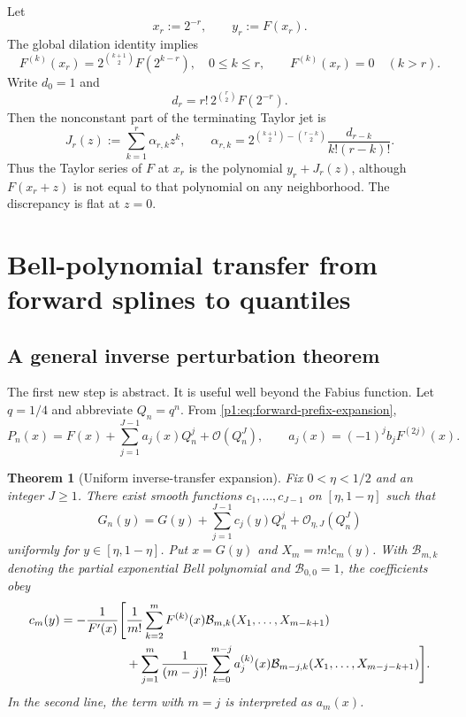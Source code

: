 \documentclass[11pt,oneside]{article}
\numberwithin{equation}{section}
\newtheorem{theorem}{Theorem}[section]
\theoremstyle{definition}
\theoremstyle{remark}
\newcommand{\bigO}{\mathcal O}
\newcommand{\InvF}{G}
\newcommand{\Fn}{P_n}
\newcommand{\Gn}{G_n}
\begin{document}
Let
\begin{equation}
 x_r:=2^{-r},\qquad y_r:=F(x_r).
 \label{p1:eq:xr-yr}
\end{equation}
The global dilation identity implies
\begin{equation}
 F^{(k)}(x_r)=2^{\binom{k+1}{2}}F(2^{k-r}),
 \quad 0\le k\le r,
 \qquad
 F^{(k)}(x_r)=0\quad(k>r).
 \label{p1:eq:dyadic-jet}
\end{equation}
Write $d_0=1$ and
\begin{equation}
 d_r=r!\,2^{\binom r2}F(2^{-r}).
 \label{p1:eq:d-def}
\end{equation}
Then the nonconstant part of the terminating Taylor jet is
\begin{equation}
 J_r(z):=\sum_{k=1}^{r}\alpha_{r,k}z^k,
 \qquad
 \alpha_{r,k}
 =2^{\binom{k+1}{2}-\binom{r-k}{2}}
 \frac{d_{r-k}}{k!(r-k)!}.
 \label{p1:eq:Jr}
\end{equation}
Thus the Taylor series of $F$ at $x_r$ is the polynomial $y_r+J_r(z)$, although
$F(x_r+z)$ is not equal to that polynomial on any neighborhood.  The discrepancy is flat
at $z=0$.

\section{Bell-polynomial transfer from forward splines to quantiles}
\label{p1:sec:inverse-transfer}

\subsection{A general inverse perturbation theorem}

The first new step is abstract.  It is useful well beyond the Fabius function.
Let $q=1/4$ and abbreviate $Q_n=q^n$.  From \eqref{p1:eq:forward-prefix-expansion},
\begin{equation}
 \Fn(x)=F(x)+\sum_{j=1}^{J-1}a_j(x)Q_n^j+\bigO(Q_n^J),
 \qquad
 a_j(x)=(-1)^jb_jF^{(2j)}(x).
 \label{p1:eq:an-def}
\end{equation}

\begin{theorem}[Uniform inverse-transfer expansion]
\label{p1:thm:inverse-transfer}
Fix $0<\eta<1/2$ and an integer $J\ge1$.  There exist smooth functions
$c_1,\ldots,c_{J-1}$ on $[\eta,1-\eta]$ such that
\begin{equation}
 \boxed{
 \Gn(y)=\InvF(y)+\sum_{j=1}^{J-1}c_j(y)Q_n^j
 +\bigO_{\eta,J}(Q_n^J)}
 \label{p1:eq:Gn-expansion}
\end{equation}
uniformly for $y\in[\eta,1-\eta]$.  Put $x=\InvF(y)$ and
$X_m=m!c_m(y)$.  With $\mathcal B_{m,k}$ denoting the partial exponential Bell
polynomial and $\mathcal B_{0,0}=1$, the coefficients obey
\begin{align}
 c_m(y)=-\frac1{F'(x)}\Bigg[&
 \frac1{m!}\sum_{k=2}^{m}F^{(k)}(x)
 \mathcal B_{m,k}(X_1,\ldots,X_{m-k+1})
 \notag\\
 &+\sum_{j=1}^{m}\frac1{(m-j)!}
 \sum_{k=0}^{m-j}a_j^{(k)}(x)
 \mathcal B_{m-j,k}(X_1,\ldots,X_{m-j-k+1})
 \Bigg].
 \label{p1:eq:Bell-inverse-recursion}
\end{align}
In the second line, the term with $m=j$ is interpreted as $a_m(x)$.
\end{theorem}
\end{document}
